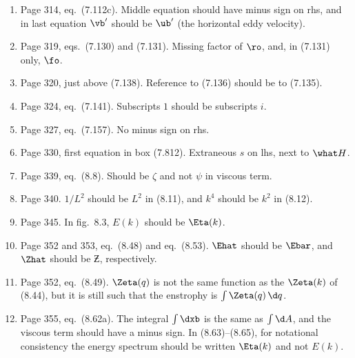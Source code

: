 \documentclass[10pt]{article}
\newcommand{\eq}{eq.\ } \newcommand{\Eq}{Eq.\ }
\begin{document}
\begin{enumerate}
\item Page 314, \eq (7.112c). Middle equation should have minus sign on rhs, and in last equation $\vb'$ should be $\ub'$ (the horizontal eddy velocity).


\item Page 319, eqs.\ (7.130) and (7.131). Missing factor of $\ro$, and, in (7.131) only, $\fo$.

\item Page 320, just above (7.138). Reference to (7.136) should be to (7.135).

\item Page 324, \eq (7.141). Subscripts $1$ should be subscripts $i$. 


\item Page 327, \eq (7.157). No minus sign on rhs.

\item Page 330, first equation in box (7.812). Extraneous $s$ on lhs, next to $\what H$.

\item Page 339, \eq (8.8). Should be $\zeta$ and not $\psi$ in viscous term. 


\item Page 340. $1/L^2$ should be $L^2$ in (8.11), and $k^4$ should be $k^2$ in (8.12).

\item Page 345. In fig.\ 8.3, $E(k)$ should be $\Eta(k)$.

\item Page 352 and 353, \eq (8.48) and \eq (8.53). $\Ehat$ should be $\Ebar$, and $\Zhat$ should be $\Zbar$, respectively.

\item Page 352, \eq (8.49).  $\Zeta(q)$ is not the same function as the $\Zeta(k)$ of (8.44), but it is still such that the enstrophy is $\int \Zeta(q) \, \d q$. 

\item Page 355, \eq (8.62a). The integral $\int \dxb$ is the same as $\int \d A$, and the viscous term should have a minus sign. In (8.63)--(8.65), for notational consistency the energy spectrum should be written $\Eta(k)$ and not $E(k)$.


\end{enumerate}
\end{document}
